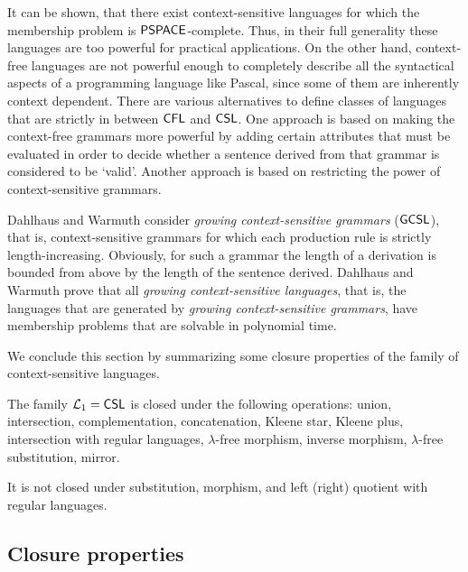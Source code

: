 It can be shown, that there exist context-sensitive languages for which the membership problem is $\textup{\sf PSPACE}$-complete. Thus, in their full generality these languages are too powerful for practical applications. On the other hand, context-free languages are not powerful enough to completely describe all the syntactical aspects of a programming language like Pascal, since some of them are inherently context dependent. There are various alternatives to define classes of languages that are strictly in between \index{$\CFL$}$\CFL$ and \index{$\CSL$}$\CSL$. One approach is based on making the context-free grammars more powerful by adding certain attributes that must be evaluated in order to decide whether a sentence derived from that grammar is considered to be `valid'. Another approach is based on restricting the power of context-sensitive grammars.

Dahlhaus and Warmuth \cite{DW86} consider \emph{growing context-sensitive grammars} \index{$\GCSL$}($\GCSL$), that is,  context-sensitive grammars for which each production rule is strictly length-increasing. Obviously, for such a grammar the length of a derivation is bounded from above by the length of the sentence derived. Dahlhaus and Warmuth prove that all \emph{growing context-sensitive languages}, that is, the languages that are generated by \emph{growing context-sensitive grammars}, have membership problems that are solvable in polynomial time.

We conclude this section by summarizing some closure properties of the family of context-sensitive languages.

\begin{theorem}
The family $\mathcal{L}_1 = \textup{\sf CSL}$ is closed under the following operations: union, intersection, complementation, concatenation, Kleene star, Kleene plus, intersection with regular languages, $\lambda$-free morphism, inverse morphism, $\lambda$-free substitution, mirror. 

It is not closed under substitution, morphism, and left (right) quotient with regular languages.
\end{theorem}

\subsection{Closure properties}
\label{subsection:closure-properties}

